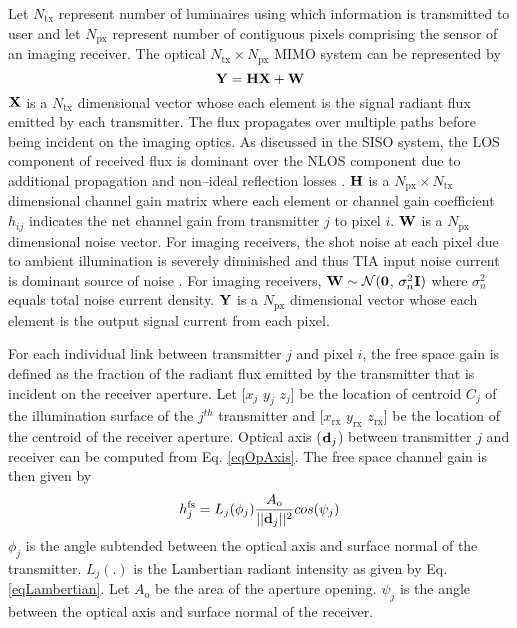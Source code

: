 Let $N_{\text{tx}}$ represent number of luminaires using which information is transmitted to user and let $N_{\text{px}}$ represent number of contiguous pixels comprising the sensor of an imaging receiver. The optical $N_{\text{tx}} \times N_{\text{px}}$ MIMO system can be represented by
\begin{equation}
	\label{eqMimoChannel3}
	\bf{Y} = \bf{H}\bf{X} + \bf{W}
\end{equation}
$\bf{X}$ is a $N_{\text{tx}}$ dimensional vector whose each element is the signal radiant flux emitted by each transmitter. The flux propagates over multiple paths before being incident on the imaging optics. As discussed in the SISO system, the LOS component of received flux is dominant over the NLOS component due to additional propagation and non--ideal reflection losses . $\bf{H}$ is a $N_{\text{px}}\times N_{\text{tx}}$ dimensional channel gain matrix where each element or channel gain coefficient $h_{ij}$ indicates the net channel gain from transmitter $j$ to pixel $i$. $\bf{W}$ is a $N_{\text{px}}$ dimensional noise vector. For imaging receivers, the shot noise at each pixel due to ambient illumination is severely diminished \cite{dja00a} and thus TIA input noise current is dominant source of noise \cite{kah97a}. For imaging receivers, ${\bf{W}}\sim\mathcal{N}({\bf{0}}$, $\sigma_{n}^2{\bf{I}})$ where $\sigma_{n}^{2}$ equals total noise current density. $\bf{Y}$ is a $N_{\text{px}}$ dimensional vector whose each element is the output signal current from each pixel.

For each individual link between transmitter $j$ and pixel $i$, the free space gain is defined as the fraction of the radiant flux emitted by the transmitter that is incident on the receiver aperture. Let [$x_{j}$ $y_{j}$ $z_{j}$] be the location of centroid $C_{j}$ of the illumination surface of the $j^{th}$ transmitter and [$x_{\text{rx}}$ $y_{\text{rx}}$ $z_{\text{rx}}$] be the location of the centroid of the receiver aperture. Optical axis (${\bf{d}}_{j}$) between transmitter $j$ and receiver can be computed from Eq. \eqref{eqOpAxis}. The free space channel gain is then given by
\begin{equation}
	\label{eqMimoHFS}
	h^{\text{fs}}_{j} = L_{j}(\phi_{j})\frac{A_{\text{o}}}{||{\bf{d}}_{j}||^2}cos(\psi_{j})
\end{equation}
$\phi_{j}$ is the angle subtended between the optical axis and surface normal of the transmitter. $L_{j}(.)$ is the Lambertian radiant intensity as given by Eq. \eqref{eqLambertian}. Let $A_{\text{o}}$ be the area of the aperture opening. $\psi_{j}$ is the angle between the optical axis and surface normal of the receiver.

